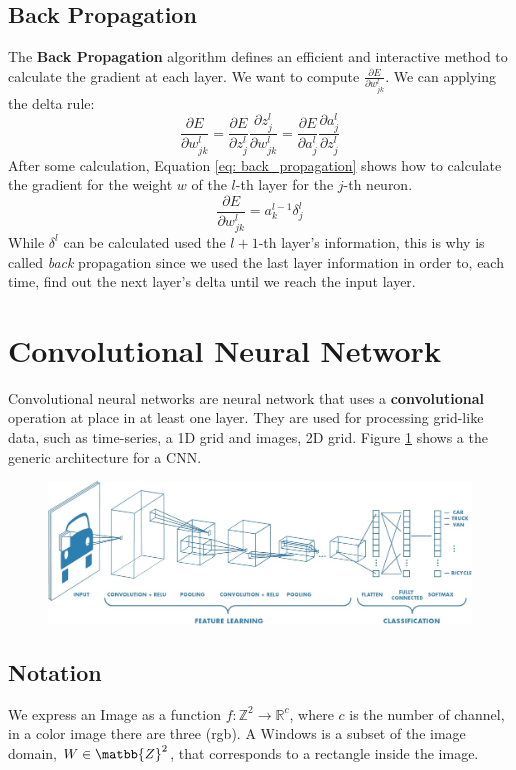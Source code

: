 \documentclass[11pt]{article}
\begin{document}
\subsection{Back Propagation}
The \textbf{Back Propagation} algorithm defines an efficient and interactive method to calculate the gradient at each layer. We want to compute $\frac{\partial E}{\partial w^l_{jk}}$. We can applying the delta rule: 
\begin{equation}
\frac{\partial E}{\partial w^l_{jk}} = \frac{\partial E}{\partial z^l_j}\frac{\partial z^l_j}{\partial w^l_{jk}} =	
\frac{\partial E}{\partial a^l_j}\frac{\partial a^l_j}{\partial z^l_{j}}
\end{equation}
After some calculation, Equation \ref{eq: back_propagation} shows how to calculate the gradient for the weight $w$ of the $l$-th layer for the $j$-th neuron.
\begin{equation}
\frac{\partial E}{\partial w^l_{jk}} = a^{l-1}_k \delta^l_j
\label{eq: back_propagation}
\end{equation}  
While $\delta^l$ can be calculated used the $l+1$-th layer's information, this is why is called \emph{back} propagation since we used the last layer information in order to, each time, find out the next layer's delta until we reach the input layer.
\section{Convolutional Neural Network}
Convolutional neural networks are neural network that uses a \textbf{convolutional} operation at place in at least one layer. They are used for processing grid-like data, such as time-series, a 1D grid and images, 2D grid. Figure \ref{fig: cnn} shows a the generic architecture for a CNN.
\begin{figure}[H]
\centering
\includegraphics[scale=0.35]{images/cnn}
\caption{}
\label{fig: cnn}	
\end{figure}
\subsection{Notation}
We express an Image as a function $f: \mathbb{Z}^2 \rightarrow \mathbb{R}^c$, where $c$ is the number of channel, in a color image there are three (rgb). A Windows is a subset of the image domain, $W \in \matbb{Z}^2$, that corresponds to a rectangle inside the image.
\end{document}
